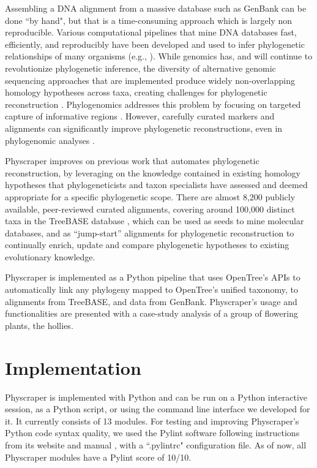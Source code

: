 \documentclass{bmcart}
\begin{document}
Assembling a DNA alignment from a massive database such as GenBank can be done ``by hand",
but that is a time-consuming approach which is largely non reproducible.
Various computational pipelines that mine DNA databases fast, efficiently, and reproducibly
have been developed and used to infer phylogenetic relationships of many organisms
(e.g., \cite{smith2009mega, antonelli2017toward, izquierdo2014pumper, pearse2013phylogenerator}).
While genomics has, and will continue to revolutionize phylogenetic inference,
the diversity of alternative genomic sequencing approaches that are implemented produce
widely non-overlapping homology hypotheses across taxa,
creating challenges for phylogenetic reconstruction \cite{jones2016targeted}.
Phylogenomics addresses this problem by focusing on targeted capture of informative
regions \cite{andermann2020guide}.
However, carefully curated markers and alignments can significantly improve phylogenetic
reconstructions, even in phylogenomic analyses \cite{fragoso2017pilot}.

Physcraper improves on previous work that automates phylogenetic reconstruction, by leveraging
on the knowledge contained in existing homology hypotheses that phylogeneticists and taxon specialists have assessed
and deemed appropriate for a specific phylogenetic scope.
There are almost 8,200 publicly available, peer-reviewed curated alignments, covering
around 100,000 distinct taxa in the TreeBASE database
\cite{piel2009treebase, vos2012nexml, piel2018treebasedmp},
which can be used as seeds to mine molecular databases, and as ``jump-start'' alignments
for phylogenetic reconstruction \cite{morrison2006multiple} to continually enrich,
update and compare phylogenetic hypotheses to existing evolutionary knowledge.

Physcraper is implemented as a Python pipeline that uses OpenTree's APIs to automatically
link any phylogeny mapped to OpenTree's unified taxonomy,
to alignments from TreeBASE, and data from GenBank.
Physcraper's usage and functionalities are presented with a case-study analysis of a
group of flowering plants, the hollies.


\section*{Implementation}

Physcraper is implemented with Python and can be run on a Python interactive session,
as a Python script, or using the command line interface we developed for it.
It currently consists of 13 modules.
For testing and improving Physcraper's Python code syntax quality, we
used the Pylint software following instructions from its website \cite{pylintWeb}
 and manual \cite{pylintManual}, with a ``.pylintrc" configuration file.
As of now, all Physcraper modules have a Pylint score of 10/10.
\end{document}
